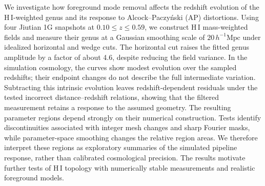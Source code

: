 We investigate how foreground mode removal affects the redshift evolution of the H\,I-weighted genus and its response to Alcock--Paczy\'nski (AP) distortions. Using four Jiutian 1G snapshots at $0.10\le z\le0.59$, we construct H\,I mass-weighted fields and measure their genus at a Gaussian smoothing scale of $20\,h^{-1}\mathrm{Mpc}$ under idealized horizontal and wedge cuts. The horizontal cut raises the fitted genus amplitude by a factor of about 4.6, despite reducing the field variance. In the simulation cosmology, the curves show modest evolution over the sampled redshifts; their endpoint changes do not describe the full intermediate variation. Subtracting this intrinsic evolution leaves redshift-dependent residuals under the tested incorrect distance--redshift relations, showing that the filtered measurement retains a response to the assumed geometry. The resulting parameter regions depend strongly on their numerical construction. Tests identify discontinuities associated with integer mesh changes and sharp Fourier masks, while parameter-space smoothing changes the relative region areas. We therefore interpret these regions as exploratory summaries of the simulated pipeline response, rather than calibrated cosmological precision. The results motivate further tests of H\,I topology with numerically stable measurements and realistic foreground models.
